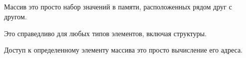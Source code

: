 ﻿\subsection{\Conclusion{}}

Массив это просто набор значений в памяти, расположенных рядом друг с другом.

Это справедливо для любых типов элементов, включая структуры.

Доступ к определенному элементу массива это просто вычисление его адреса.

